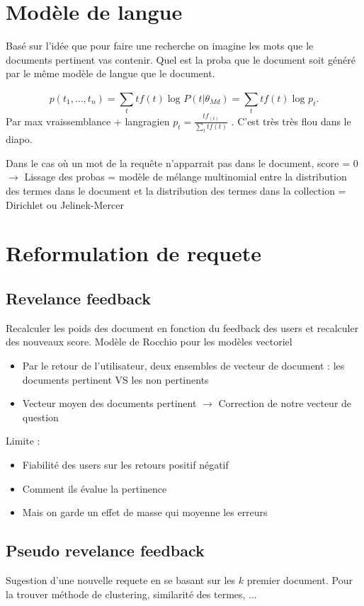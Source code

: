 \documentclass{article}
\theoremstyle{plain}%
\theoremstyle{definition}
\theoremstyle{remark}
\begin{document}
\section{Modèle de langue }
Basé sur l'idée que pour faire une recherche on imagine les mots que le documents pertinent vas contenir. Quel est la proba que le document soit généré par le même modèle de langue que le document.

\[
    p(t_1, \dots, t_n) = \sum_{t}^{}tf(t)\log_{} P(t | \theta _{Md}) = \sum_{t}^{}tf(t)\log_{} p_t
.\]
Par max vraissemblance + langragien  $ p_t = \frac{tf_(t)}{\sum_{t}^{}tf(t)} $ . C'est très très flou dans le diapo.

Dans le cas où un mot de la requête n'apparrait pas dans le document, score = 0 $\rightarrow$ Lissage des probas = modèle de
mélange multinomial entre la distribution des termes dans le
document et la distribution des termes dans la collection = Dirichlet ou Jelinek-Mercer

\section{Reformulation de requete}
\subsection{Revelance feedback}
Recalculer les poids des document en fonction du feedback des users et recalculer des nouveaux score. Modèle de Rocchio pour les modèles vectoriel \begin{itemize}
    \item Par le retour de l'utilisateur, deux ensembles de vecteur de document : les documents pertinent VS les non pertinents
    \item Vecteur moyen des documents pertinent $\rightarrow$ Correction de notre vecteur de question 
\end{itemize}
Limite : 
\begin{itemize}
    \item Fiabilité des users sur les retours positif négatif 
    \item Comment ils évalue la pertinence
    \item Mais on garde un effet de masse qui moyenne les erreurs 
\end{itemize}

\subsection{Pseudo revelance feedback}
Sugestion d'une nouvelle requete en se basant sur les $ k $ premier document. Pour la trouver méthode de clustering, similarité des termes, ...
\end{document}
